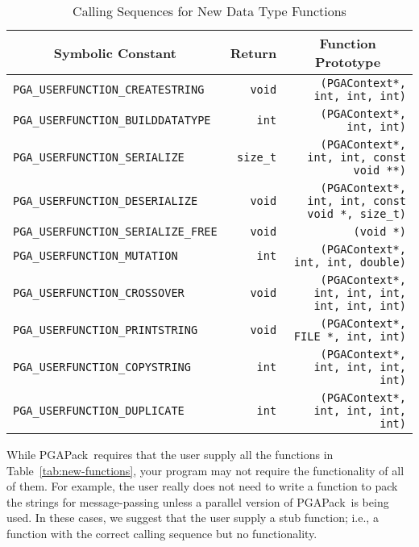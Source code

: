\documentclass{report}
\newcommand{\pga}{PGAPack}
\begin{document}
\begin{table}
\centering
\caption
{
Calling Sequences for New Data Type Functions\label{tab:new-functions1}
}
\begin{tabular}{|l|r|r|} \hline\hline
\multicolumn{1}{|c|}{Symbolic Constant} &
\multicolumn{1}{|c|}{Return} &
\multicolumn{1}{c|}{Function Prototype} \\ \hline
\verb+PGA_USERFUNCTION_CREATESTRING+   & \verb+void+       &
    \verb+(PGAContext*, int, int, int)+                   \\
\verb+PGA_USERFUNCTION_BUILDDATATYPE+  & \verb+int+        &
    \verb+(PGAContext*, int, int)+                        \\
\verb+PGA_USERFUNCTION_SERIALIZE+      & \verb+size_t+     &
    \verb+(PGAContext*, int, int, const void **)+         \\
\verb+PGA_USERFUNCTION_DESERIALIZE+    & \verb+void+       &
    \verb+(PGAContext*, int, int, const void *, size_t)+  \\
\verb+PGA_USERFUNCTION_SERIALIZE_FREE+ & \verb+void+       &
    \verb+(void *)+                                       \\
\verb+PGA_USERFUNCTION_MUTATION+       & \verb+int+        &
    \verb+(PGAContext*, int, int, double)+                \\
\verb+PGA_USERFUNCTION_CROSSOVER+      & \verb+void+       &
    \verb+(PGAContext*, int, int, int, int, int, int)+    \\
\verb+PGA_USERFUNCTION_PRINTSTRING+    & \verb+void+       &
    \verb+(PGAContext*, FILE *, int, int)+                \\
\verb+PGA_USERFUNCTION_COPYSTRING+     & \verb+int+        &
    \verb+(PGAContext*, int, int, int, int)+              \\
\verb+PGA_USERFUNCTION_DUPLICATE+      & \verb+int+        &
    \verb+(PGAContext*, int, int, int, int)+              \\
\hline
\end{tabular}
\end{table}

While \pga\ requires that the user supply all the functions in
Table~\ref{tab:new-functions}, your program may not require the functionality
of all of them.  For example, the user really does not need to write a
function to pack the strings for message-passing unless a parallel version of
\pga\ is being used.  In these cases, we
suggest that the user supply a stub function; i.e., a function with the
correct calling sequence but no functionality.
\end{document}
